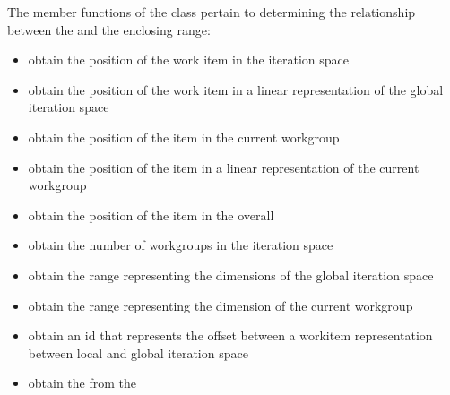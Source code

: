 \documentclass[letterpaper,10pt,english]{sphinxmanual}
\begin{document}
The member functions of the  class pertain to determining the
relationship between the  and the enclosing range:
\begin{itemize}
\item {} 
 \textendash{} obtain the position of the work item in the
iteration space

\item {} 
 \textendash{} obtain the position of the work item in a
linear representation of the global iteration space

\item {} 
 \textendash{} obtain the position of the item in the current
work\sphinxhyphen{}group

\item {} 
 \textendash{} obtain the position of the item in a linear
representation of the current work\sphinxhyphen{}group

\item {} 
 \textendash{} obtain the position of the item in the overall

\item {} 
 \textendash{} obtain the number of work\sphinxhyphen{}groups in the
iteration space

\item {} 
 \textendash{} obtain the range representing the dimensions
of the global iteration space

\item {} 
 \textendash{} obtain the range representing the dimension of
the current work\sphinxhyphen{}group

\item {} 
 \textendash{} obtain an id that represents the offset between a
work\sphinxhyphen{}item representation between local and global iteration space

\item {} 
 \textendash{} obtain the  from the 

\end{itemize}
\end{document}
